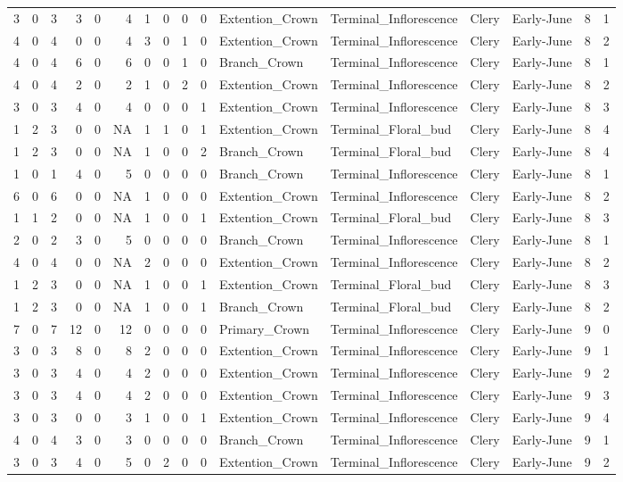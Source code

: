 \documentclass[]{article}
\begin{document}
\begin{longtable}[]{@{}rrrrrrrrrrllllrl@{}}
3 & 0 & 3 & 3 & 0 & 4 & 1 & 0 & 0 & 0 & Extention\_Crown &
Terminal\_Inflorescence & Clery & Early-June & 8 & 1\tabularnewline
4 & 0 & 4 & 0 & 0 & 4 & 3 & 0 & 1 & 0 & Extention\_Crown &
Terminal\_Inflorescence & Clery & Early-June & 8 & 2\tabularnewline
4 & 0 & 4 & 6 & 0 & 6 & 0 & 0 & 1 & 0 & Branch\_Crown &
Terminal\_Inflorescence & Clery & Early-June & 8 & 1\tabularnewline
4 & 0 & 4 & 2 & 0 & 2 & 1 & 0 & 2 & 0 & Extention\_Crown &
Terminal\_Inflorescence & Clery & Early-June & 8 & 2\tabularnewline
3 & 0 & 3 & 4 & 0 & 4 & 0 & 0 & 0 & 1 & Extention\_Crown &
Terminal\_Inflorescence & Clery & Early-June & 8 & 3\tabularnewline
1 & 2 & 3 & 0 & 0 & NA & 1 & 1 & 0 & 1 & Extention\_Crown &
Terminal\_Floral\_bud & Clery & Early-June & 8 & 4\tabularnewline
1 & 2 & 3 & 0 & 0 & NA & 1 & 0 & 0 & 2 & Branch\_Crown &
Terminal\_Floral\_bud & Clery & Early-June & 8 & 4\tabularnewline
1 & 0 & 1 & 4 & 0 & 5 & 0 & 0 & 0 & 0 & Branch\_Crown &
Terminal\_Inflorescence & Clery & Early-June & 8 & 1\tabularnewline
6 & 0 & 6 & 0 & 0 & NA & 1 & 0 & 0 & 0 & Extention\_Crown &
Terminal\_Inflorescence & Clery & Early-June & 8 & 2\tabularnewline
1 & 1 & 2 & 0 & 0 & NA & 1 & 0 & 0 & 1 & Extention\_Crown &
Terminal\_Floral\_bud & Clery & Early-June & 8 & 3\tabularnewline
2 & 0 & 2 & 3 & 0 & 5 & 0 & 0 & 0 & 0 & Branch\_Crown &
Terminal\_Inflorescence & Clery & Early-June & 8 & 1\tabularnewline
4 & 0 & 4 & 0 & 0 & NA & 2 & 0 & 0 & 0 & Extention\_Crown &
Terminal\_Inflorescence & Clery & Early-June & 8 & 2\tabularnewline
1 & 2 & 3 & 0 & 0 & NA & 1 & 0 & 0 & 1 & Extention\_Crown &
Terminal\_Floral\_bud & Clery & Early-June & 8 & 3\tabularnewline
1 & 2 & 3 & 0 & 0 & NA & 1 & 0 & 0 & 1 & Branch\_Crown &
Terminal\_Floral\_bud & Clery & Early-June & 8 & 2\tabularnewline
7 & 0 & 7 & 12 & 0 & 12 & 0 & 0 & 0 & 0 & Primary\_Crown &
Terminal\_Inflorescence & Clery & Early-June & 9 & 0\tabularnewline
3 & 0 & 3 & 8 & 0 & 8 & 2 & 0 & 0 & 0 & Extention\_Crown &
Terminal\_Inflorescence & Clery & Early-June & 9 & 1\tabularnewline
3 & 0 & 3 & 4 & 0 & 4 & 2 & 0 & 0 & 0 & Extention\_Crown &
Terminal\_Inflorescence & Clery & Early-June & 9 & 2\tabularnewline
3 & 0 & 3 & 4 & 0 & 4 & 2 & 0 & 0 & 0 & Extention\_Crown &
Terminal\_Inflorescence & Clery & Early-June & 9 & 3\tabularnewline
3 & 0 & 3 & 0 & 0 & 3 & 1 & 0 & 0 & 1 & Extention\_Crown &
Terminal\_Inflorescence & Clery & Early-June & 9 & 4\tabularnewline
4 & 0 & 4 & 3 & 0 & 3 & 0 & 0 & 0 & 0 & Branch\_Crown &
Terminal\_Inflorescence & Clery & Early-June & 9 & 1\tabularnewline
3 & 0 & 3 & 4 & 0 & 5 & 0 & 2 & 0 & 0 & Extention\_Crown &
Terminal\_Inflorescence & Clery & Early-June & 9 & 2\tabularnewline

\end{longtable}
\end{document}
